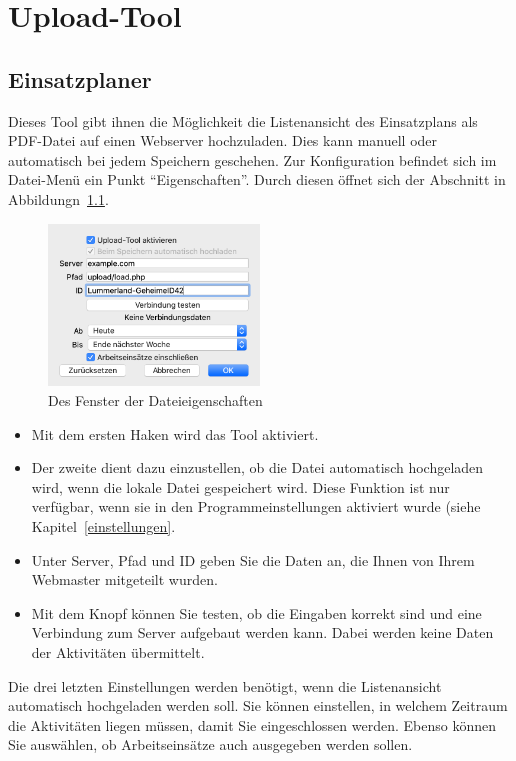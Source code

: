 \chapter{Upload-Tool}\label{upload}
\section{Einsatzplaner}\label{upload:client}
Dieses Tool gibt ihnen die Möglichkeit die Listenansicht des Einsatzplans als PDF-Datei auf einen Webserver hochzuladen.
Dies kann manuell oder automatisch bei jedem Speichern geschehen.
Zur Konfiguration befindet sich im Datei-Menü ein Punkt "`Eigenschaften"'.
Durch diesen öffnet sich der Abschnitt in Abbildungn~\ref{fig:uploadtool}.
\begin{figure}[!h]
  \centering
	\includegraphics[width=0.5\textwidth]{img/eigenschaften_upload}
	\caption{Des Fenster der Dateieigenschaften}
	\label{fig:uploadtool}
\end{figure}
\begin{itemize}
  \item
  Mit dem ersten Haken wird das Tool aktiviert.
  \item
  Der zweite dient dazu einzustellen, ob die Datei automatisch hochgeladen wird, wenn die lokale Datei gespeichert wird.
  Diese Funktion ist nur verfügbar, wenn sie in den Programmeinstellungen aktiviert wurde (siehe Kapitel~\ref{einstellungen}.
  \item
  Unter Server, Pfad und ID geben Sie die Daten an, die Ihnen von Ihrem Webmaster mitgeteilt wurden.
  \item
  Mit dem Knopf können Sie testen, ob die Eingaben korrekt sind und eine Verbindung zum Server aufgebaut werden kann.
  Dabei werden keine Daten der Aktivitäten übermittelt.
\end{itemize}
Die drei letzten Einstellungen werden benötigt, wenn die Listenansicht automatisch hochgeladen werden soll.
Sie können einstellen, in welchem Zeitraum die Aktivitäten liegen müssen, damit Sie eingeschlossen werden.
Ebenso können Sie auswählen, ob Arbeitseinsätze auch ausgegeben werden sollen.

